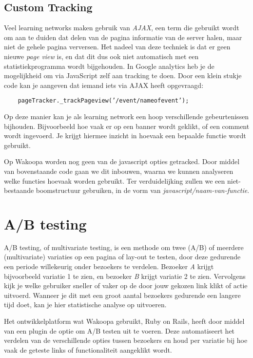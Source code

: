 \documentclass[a4paper, 10pt, pdftex]{report}
\begin{document}
    \subsection{Custom Tracking}
    Veel learning networks maken gebruik van \emph{AJAX}, een term die gebruikt wordt om aan te duiden dat delen van de pagina informatie van de server halen, maar niet de gehele pagina verversen. Het nadeel van deze techniek is dat er geen nieuwe \emph{page view} is, en dat dit dus ook niet automatisch met een statistiekprogramma wordt bijgehouden. In Google analytics heb je de mogelijkheid om via JavaScript zelf aan tracking te doen. Door een klein stukje code kan je aangeven dat iemand iets via AJAX heeft opgevraagd:
    \begin{verbatim}
    pageTracker._trackPageview(’/event/nameofevent’);
    \end{verbatim}
    Op deze manier kan je als learning network een hoop verschillende gebeurtenissen bijhouden. Bijvoorbeeld hoe vaak er op een banner wordt geklikt, of een comment wordt ingevoerd. Je krijgt hiermee inzicht in hoevaak een bepaalde functie wordt gebruikt.

    Op Wakoopa worden nog geen van de javascript opties getracked. Door middel van bovenstaande code gaan we dit inbouwen, waarna we kunnen analyseren welke functies hoevaak worden gebruikt. Ter verduidelijking zullen we een niet-bestaande boomstructuur gebruiken, in de vorm van \emph{javascript/naam-van-functie}.

    \section{A/B testing}
    A/B testing, of multivariate testing, is een methode om twee (A/B) of meerdere (multivariate) variaties op een pagina of lay-out te testen, door deze gedurende een periode willekeurig onder bezoekers te verdelen. Bezoeker \emph{A} krijgt bijvoorbeeld variatie 1 te zien, en bezoeker \emph{B} krijgt variatie 2 te zien. Vervolgens kijk je welke gebruiker sneller of vaker op de door jouw gekozen link klikt of actie uitvoerd. Wanneer je dit met een groot aantal bezoekers gedurende een langere tijd doet, kan je hier statistische analyse op uitvoeren.

   Het ontwikkelplatform wat Wakoopa gebruikt, Ruby on Rails, heeft door middel van een plugin de optie om A/B testen uit te voeren. Deze automatiseert het verdelen van de verschillende opties tussen bezoekers en houd per variatie bij hoe vaak de geteste links of functionaliteit aangeklikt wordt.
\end{document}
